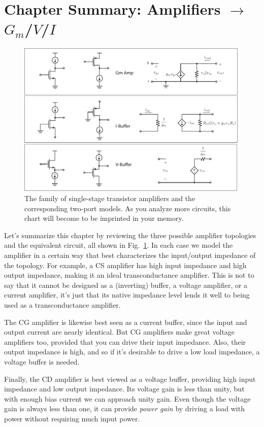 \section{Chapter Summary: Amplifiers $\rightarrow$ $G_m$/$V$/$I$}
\begin{figure}[tb]
\begin{center}
\includegraphics[width=\columnwidth]{ampchart_models}
\end{center}
\caption{The family of single-stage transistor amplifiers and the corresponding two-port models.  As you analyze more circuits, this chart will become to be imprinted in your memory.} \label{fig:ampchart_models}
\end{figure}

Let's summarize this chapter by reviewing the three possible amplifier topologies and the equivalent circuit, all shown in Fig.~\ref{fig:ampchart_models}.  In each case we model the amplifier in a certain way that best characterizes the input/output impedance of the topology.  For example, a CS amplifier has high input impedance and high output impedance, making it an ideal transconductance amplifier.  This is not to say that it cannot be designed as a (inverting) buffer, a voltage amplifier, or a current amplifier, it's just that its native impedance level lends it well to being used as a transconductance amplifier.  

The CG amplifier is likewise best seen as a current buffer, since the input and output current are nearly identical.  But CG amplifiers make great voltage amplifiers too, provided that you can drive their input impedance.  Also, their output impedance is high, and so if it's desirable to drive a low load impedance, a voltage buffer is needed.  

Finally, the CD amplifier is best viewed as a voltage buffer, providing high input impedance and low output impedance.  Its voltage gain is less than unity, but with enough bias current we can approach unity gain.  Even though the voltage gain is always less than one, it can provide \emph{power gain} by driving a load with power without requiring much input power.
